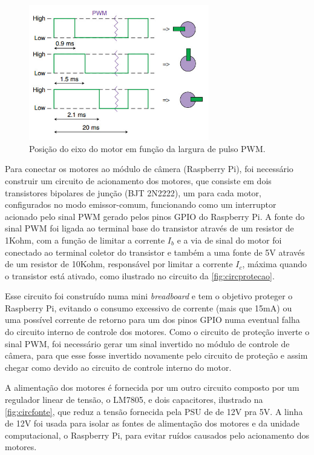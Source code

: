 \begin{figure}[H]
	\centering
	\includegraphics[width=0.7\textwidth]{figuras/pwm_servo.jpg}
	\caption{Posição do eixo do motor em função da largura de pulso PWM.}
	\label{fig:pwmservo}
\end{figure}

Para conectar os motores ao módulo de câmera (Raspberry Pi), foi necessário construir um circuito de acionamento dos motores, que consiste em dois transistores bipolares de junção (BJT 2N2222), um para cada motor, configurados no modo emissor-comum, funcionando como um interruptor acionado pelo sinal PWM gerado pelos pinos GPIO do Raspberry Pi. A fonte do sinal PWM foi ligada ao terminal base do transistor através de um resistor de 1Kohm, com a função de limitar a corrente $I_b$ e a via de sinal do motor foi conectado ao terminal coletor do transistor e também a uma fonte de 5V através de um resistor de 10Kohm, responsável por limitar a corrente $I_c$, máxima quando o transistor está ativado, como ilustrado no circuito da \autoref{fig:circprotecao}.\par
Esse circuito foi construído numa mini \textit{breadboard} e tem o objetivo proteger o Raspberry Pi, evitando o consumo excessivo de corrente (mais que 15mA) ou uma possível corrente de retorno para um dos pinos GPIO numa eventual falha do circuito interno de controle dos motores. Como o circuito de proteção inverte o sinal PWM, foi necessário gerar um sinal invertido no módulo de controle de câmera, para que esse fosse invertido novamente pelo circuito de proteção e assim chegar como devido ao circuito de controle interno do motor.\par
A alimentação dos motores é fornecida por um outro circuito composto por um regulador linear de tensão, o LM7805, e dois capacitores, ilustrado na \autoref{fig:circfonte}, que reduz a tensão fornecida pela PSU de de 12V pra 5V. A linha de 12V foi usada para isolar as fontes de alimentação dos motores e da unidade computacional, o Raspberry Pi, para evitar ruídos causados pelo acionamento dos motores.

